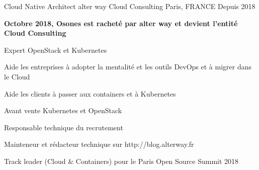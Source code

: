 

\begin{cventries}

  \cventry
    {Cloud Native Architect} %
    {alter way Cloud Consulting} %
    {Paris, FRANCE} %
    {Depuis 2018} %
    {
      \begin{cvitems} %
      \item {\textbf{Octobre 2018, Osones est racheté par alter way et devient
        l'entité Cloud Consulting}}
      \item {Expert OpenStack et Kubernetes}
      \item {Aide les entreprises à adopter la mentalité et les outils DevOps
        et à migrer dans le Cloud}
      \item {Aide les clients à passer aux containers et à Kubernetes}
      \item {Avant vente Kubernetes et OpenStack}
      \item {Responsable technique du recrutement}
      \item {Mainteneur et rédacteur technique sur http://blog.alterway.fr}
      \item {Track leader (Cloud & Containers) pour le Paris Open Source Summit
        2018}
      \end{cvitems}
    }


\end{cventries}
